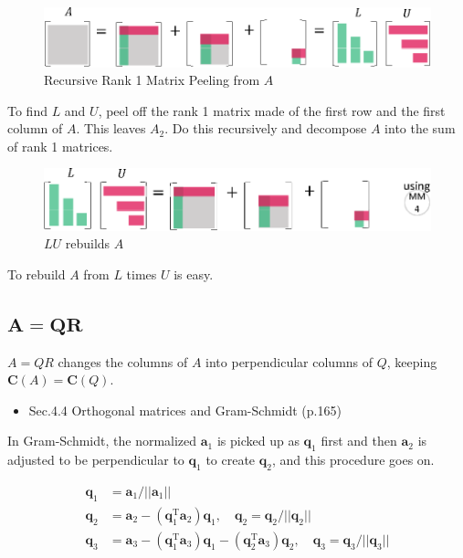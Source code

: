 \documentclass[letterpaper]{article}
\DeclareRobustCommand\transp{^{\mathrm{T}}}
\begin{document}
\begin{figure}[H]
  \centering
  \includegraphics[scale=0.8]{LU1.eps}
\caption{Recursive Rank 1 Matrix Peeling from $A$}
\end{figure}

To find $L$ and $U$, peel off the rank 1 matrix made of
the first row and the first column of $A$.
This leaves $A_2$. Do this recursively and decompose $A$ into the sum of rank 1 matrices.


\begin{figure}[H]
  \centering
  \includegraphics[scale=0.8]{LU2.eps}
\caption{$LU$ rebuilds $A$}
\end{figure}

To rebuild $A$ from $L$ times $U$ is easy.

\subsection{$\boldsymbol{A=QR}$}

$A=QR$ changes the columns of $A$ into perpendicular columns of $Q$, keeping $\bm{C}(A) = \bm{C}(Q)$.

\begin{itemize}
  \item Sec.4.4 Orthogonal matrices and Gram-Schmidt (p.165)
\end{itemize}

In Gram-Schmidt, the normalized $\bm{a}_1$ is picked up as $\bm{q}_1$ first and then
$\bm{a}_2$ is adjusted to be perpendicular to $\bm{q}_1$ to create $\bm{q}_2$, and this
procedure goes on.

\begin{align*}
  \bm{q}_1 &= \bm{a}_1/||\bm{a}_1|| \\
  \bm{q}_2 &= \bm{a}_2 - (\bm{q}_1\transp \bm{a}_2)\bm{q}_1 , \quad \bm{q}_2 = \bm{q}_2/||\bm{q}_2|| \\
  \bm{q}_3 &= \bm{a}_3 - (\bm{q}_1\transp \bm{a}_3)\bm{q}_1 - (\bm{q}_2\transp \bm{a}_3)\bm{q}_2, \quad \bm{q}_3 = \bm{q}_3/||\bm{q}_3||
\end{align*}
\end{document}

